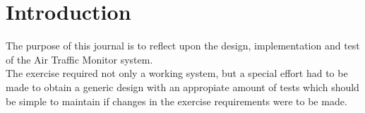 \section{Introduction}
The purpose of this journal is to reflect upon the design, implementation and test of the Air Traffic Monitor system.\\
The exercise required not only a working system, but a special effort had to be made to obtain a generic design with an appropiate amount of tests which should be simple to maintain if changes in the exercise requirements were to be made. \\

